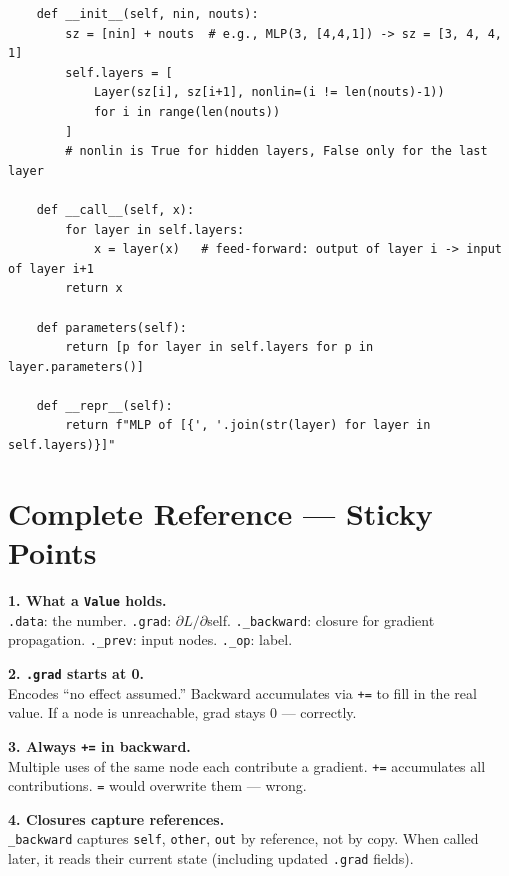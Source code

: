 \documentclass[12pt,a4paper]{article}
\newcommand{\code}[1]{\texttt{\small\color{deepblue}#1}}
\begin{document}
\begin{lstlisting}
    def __init__(self, nin, nouts):
        sz = [nin] + nouts  # e.g., MLP(3, [4,4,1]) -> sz = [3, 4, 4, 1]
        self.layers = [
            Layer(sz[i], sz[i+1], nonlin=(i != len(nouts)-1))
            for i in range(len(nouts))
        ]
        # nonlin is True for hidden layers, False only for the last layer

    def __call__(self, x):
        for layer in self.layers:
            x = layer(x)   # feed-forward: output of layer i -> input of layer i+1
        return x

    def parameters(self):
        return [p for layer in self.layers for p in layer.parameters()]

    def __repr__(self):
        return f"MLP of [{', '.join(str(layer) for layer in self.layers)}]"
\end{lstlisting}

\section{Complete Reference — Sticky Points}

\begin{stickybox}
\textbf{1. What a \texttt{Value} holds.}\\
\code{.data}: the number. \code{.grad}: $\partial L / \partial$self. \code{.\_backward}: closure for gradient propagation. \code{.\_prev}: input nodes. \code{.\_op}: label.
\end{stickybox}

\begin{stickybox}
\textbf{2. \texttt{.grad} starts at 0.}\\
Encodes ``no effect assumed.'' Backward accumulates via \code{+=} to fill in the real value. If a node is unreachable, grad stays 0 — correctly.
\end{stickybox}

\begin{stickybox}
\textbf{3. Always \texttt{+=} in backward.}\\
Multiple uses of the same node each contribute a gradient. \code{+=} accumulates all contributions. \code{=} would overwrite them — wrong.
\end{stickybox}

\begin{stickybox}
\textbf{4. Closures capture references.}\\
\code{\_backward} captures \code{self}, \code{other}, \code{out} by reference, not by copy. When called later, it reads their current state (including updated \code{.grad} fields).
\end{stickybox}
\end{document}
